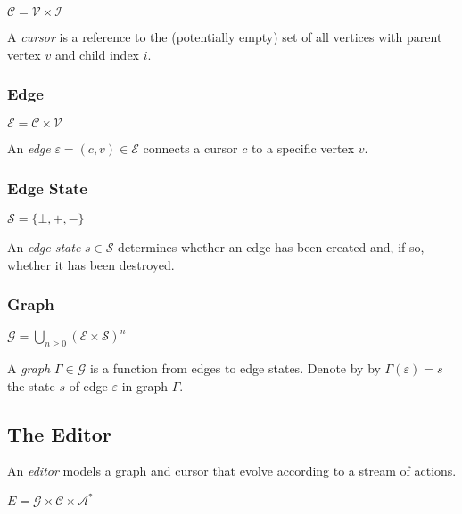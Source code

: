 \documentclass[letterpaper,12pt]{article}
\def\A{\mathcal{A}}
\def\C{\mathcal{C}}
\def\E{\mathcal{E}}
\def\G{\mathcal{G}}
\def\I{\mathcal{I}}
\def\S{\mathcal{S}}
\def\V{\mathcal{V}}
\def\e{\varepsilon}
\begin{document}
$\C = \V \times \I$

A \emph{cursor} is a reference to the (potentially empty) set of all vertices
with parent vertex $v$ and child index $i$.


\subsubsection{Edge}
\label{sec:edge}

$\E = \C \times \V$

An \emph{edge} $\e = (c, v) \in \E$ connects a cursor $c$ to a specific vertex
$v$.


\subsubsection{Edge State}
\label{sec:edge-state}

$\S = \{\bot,+,-\}$

An \emph{edge state} $s \in \S$ determines whether an edge has been created
and, if so, whether it has been destroyed.


\subsubsection{Graph}
\label{sec:graph}

$\G = \bigcup_{n \ge 0} (\E \times \S)^n$

A \emph{graph} $\Gamma \in \G$ is a function from edges to edge states. Denote
by by $\Gamma(\e) = s$ the state $s$ of edge $\e$ in graph $\Gamma$.


\subsection{The Editor}
\label{sec:the-editor}

An \emph{editor} models a graph and cursor that evolve according to a stream
of actions.

$E = \G \times \C \times \A^{*}$

\end{document}
